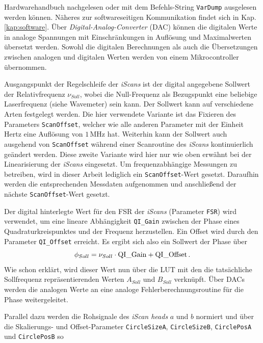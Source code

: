 Hardwarehandbuch nachgelesen oder mit dem Befehls-String \lstinline|VarDump| ausgelesen werden
können. Näheres zur softwareseitigen Kommunikation findet sich in Kap.
\ref{kap:software}. Über \textit{Digital-Analog-Converter} (DAC) können die
digitalen Werte in analoge Spannungen mit Einschränkungen in Auflösung und
Maximalwerten übersetzt werden. Sowohl die digitalen Berechnungen als auch
die Übersetzungen zwischen analogen und digitalen Werten werden von einem
Mikrocontroller übernommen.\par
Ausgangspunkt der Regelschleife der \textit{iScans} ist der digital angegebene
Sollwert der Relativfrequenz $\nu_{Soll}$, wobei die Null-Frequenz als Bezugspunkt eine
beliebige Laserfrequenz (siehe Wavemeter) sein kann. Der Sollwert kann auf
verschiedene Arten festgelegt werden. Die hier verwendete Variante ist das
Fixieren des Parameters \lstinline|ScanOffset|, welcher wie alle anderen
Parameter mit der Einheit Hertz eine Auflösung von $1\,$MHz hat. Weiterhin kann der Sollwert auch
ausgehend von \lstinline|ScanOffset| während einer Scanroutine des
\textit{iScans} kontinuierlich geändert werden. Diese zweite Variante wird hier
nur wie oben erwähnt bei der Linearisierung der \textit{iScans} eingesetzt. Um
frequenzabhängige Messungen zu betreiben, wird in dieser Arbeit lediglich ein
\lstinline|ScanOffset|-Wert gesetzt. Daraufhin werden die entsprechenden
Messdaten aufgenommen und anschließend der nächste \lstinline|ScanOffset|-Wert
gesetzt.\par
Der digital hinterlegte Wert für den FSR der \textit{iScans} (Parameter
\lstinline|FSR|) wird verwendet, um eine lineare Abhängigkeit
\lstinline|QI_Gain| zwischen der Phase eines Quadraturkreispunktes und der
Frequenz herzustellen. Ein Offset wird durch den Parameter \lstinline|QI_Offset| erreicht. Es ergibt sich also ein Sollwert der Phase über
\begin{equation}\label{eq:iscan_soll_phase_berechnung}
	\phi_{Soll}=\nu_{Soll}\cdot\text{\lstinline|QI_Gain|}+\text{\lstinline|QI_Offset|}\,.
\end{equation}
Wie schon erklärt, wird dieser Wert nun über die LUT mit den die tatsächliche
Sollfrequenz repräsentierenden Werten $A_{Soll}$ und $B_{Soll}$ verknüpft. Über
DACs werden die analogen Werte an eine analoge Fehlerberechnungsroutine für die
Phase weitergeleitet.\par
Parallel dazu werden die Rohsignale des \textit{iScan heads} $a$ und $b$
normiert und über die Skalierungs- und Offset-Parameter \lstinline|CircleSizeA|,
\lstinline|CircleSizeB|, \lstinline|CirclePosA| und \lstinline|CirclePosB| so

